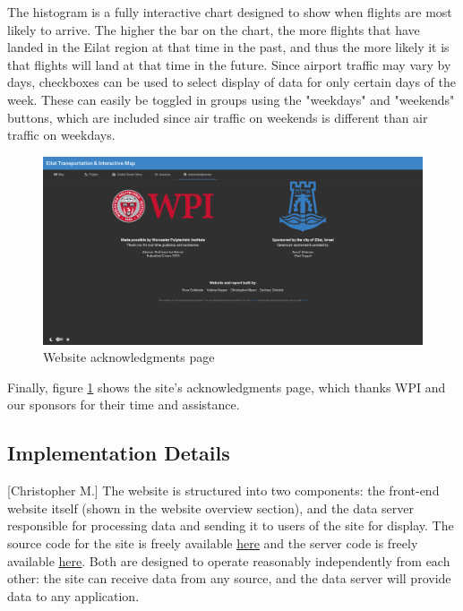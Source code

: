 \documentclass[12pt]{article}                       %
\begin{document}
The histogram is a fully interactive chart designed to show when flights are most likely to arrive. The higher the bar on the chart, the more flights that have landed in the Eilat region at that time in the past, and thus the more likely it is that flights will land at that time in the future. Since airport traffic may vary by days, checkboxes can be used to select display of data for only certain days of the week. These can easily be toggled in groups using the "weekdays" and "weekends" buttons, which are included since air traffic on weekends is different than air traffic on weekdays.

\begin{figure}[H]
    \centering
    \includegraphics[width=13cm]{images/site_about.png}
    \caption{Website acknowledgments page}
    \label{img:site_about}
\end{figure}

Finally, figure \ref{img:site_about} shows the site's acknowledgments page, which thanks WPI and our sponsors for their time and assistance.

\subsection{Implementation Details}[Christopher M.]
The website is structured into two components: the front-end website itself (shown in the website overview section), and the data server responsible for processing data and sending it to users of the site for display. The source code for the site is freely available \underline{\href{https://github.com/c7c8/Eilat-Transport-Map-Site}{here}} and the server code is freely available \underline{\href{https://github.com/c7c8/Eilat-Transport-Map-Server}{here}}. Both are designed to operate reasonably independently from each other: the site can receive data from any source, and the data server will provide data to any application.
\end{document}
